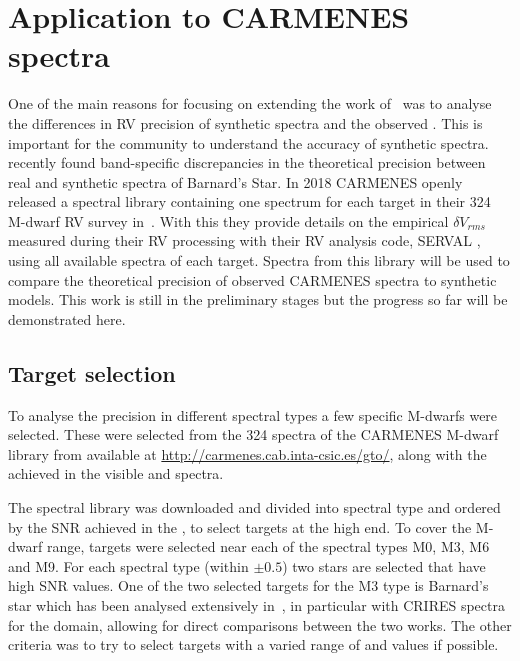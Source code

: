 
\section{Application to {CARMENES} spectra}

One of the main reasons for focusing on extending the work of~\citet{figueira_radial_2016} was to analyse the differences in {RV} precision of synthetic spectra and the observed \nir{}.
This is important for the community to understand the accuracy of synthetic spectra.
\citet{artigau_optical_2018} recently found band-specific discrepancies in the theoretical precision between real and synthetic \nir{} spectra of Barnard's Star.
In 2018 {CARMENES} openly released a spectral library containing one spectrum for each target in their 324 M-dwarf {RV} survey in~\citet{reiners_carmenes_2018}.
With this they provide details on the empirical \(\delta V_{rms}\) measured during their {RV} processing with their {RV} analysis code, {SERVAL} \citep{zechmeister_spectrum_2018}, using all available spectra of each target.
Spectra from this library will be used to compare the theoretical precision of observed {CARMENES} spectra to synthetic models.
This work is still in the preliminary stages but the progress so far will be demonstrated here.

\subsection{Target selection}
\label{subsec:carmense_targets}
To analyse the precision in different spectral types a few specific M-dwarfs were selected.
These were selected from the 324 spectra of the {CARMENES} M-dwarf library from \citet{reiners_carmenes_2018} available at \href{http://carmenes.cab.inta-csic.es/gto/}{http://carmenes.cab.inta-csic.es/gto/}, along with the achieved \snr{} in the visible and \nir{} spectra.

The spectral library was downloaded and divided into spectral type and ordered by the {SNR} achieved in the \nir{}, to select targets at the high \snr{} end.
To cover the M-dwarf range, targets were selected near each of the spectral types M0, M3, M6 and M9.
For each spectral type (within $\pm0.5$) two stars are selected that have high {SNR} values.
One of the two selected targets for the M3 type is Barnard's star which has been analysed extensively in~\citet{artigau_optical_2018}, in particular with CRIRES spectra for the \nir{} domain, allowing for direct comparisons between the two works.
The other criteria was to try to select targets with a varied range of \Logg{} and \feh{} values if possible.

